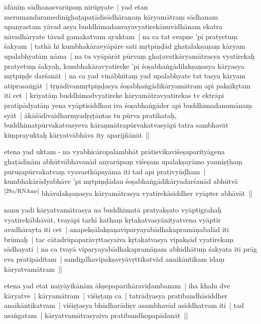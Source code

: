 \documentclass[article,a4paper]{memoir}
\newcommand{\gap}[1]{}
\newcommand{\deletion}[1]{($^{-}$#1)}
\begin{document}
	  \pstart idā\-nī\-ṃ sā\-dhanasvarū\-paṃ nirū\-pyate | yad etan merumandaramedinī\-ghaṭapaṭā\-disā\-dhā\-raṇaṃ kā\-ryamā\-traṃ sā\-dhanam upanyastam yā\-vad asya buddhimadanvayavyatirekā\-nuvidhā\-nam ekatra nā\-vadhā\-ryate tā\-vad gamakatvam ayuktam | na ca tat svapne 'pi pratyetuṃ śakyam | tathā\- hi kumbhakā\-ravyā\-pā\-re sati mṛtpiṇḍā\-d ghaṭalakṣaṇaṃ kā\-ryam upalabhyatā\-ṃ nā\-ma | na tu vyā\-pā\-rā\-t pū\-rvaṃ ghaṭavatkā\-ryamā\-trasya vyatirekaḥ pratyetuṃ śakyaḥ, kumbhakā\-ravyatireke 'pi śoṣabhaṅgā\-dilakṣaṇasya kā\-ryasya mṛtpiṇḍe darśanā\-t | na ca yad vinā\-bhū\-taṃ yad upalabhyate tat tasya kā\-ryam atiprasaṅgā\-t | tṛṇā\-divanmṛtpiṇḍasya śoṣabhaṅgā\-dikā\-ryamā\-tram api pakṣī\-kṛtam iti cet | kriyatā\-ṃ buddhimadvyatireke kā\-ryamā\-travyatirekas tv ektrā\-pi pratipā\-dyatā\-ṃ yena vyā\-ptisiddhau \edtext{tṛṇādir}{\Afootnote{tṛṇā\-di\deletion{|}\gap{}r \cite{}; tṛṇā\-dir \cite{}  {\rmlatinfont [App type: var]}}} iva śoṣabhaṅgā\-der api buddhimadanumā\-naṃ syā\-t | ā\-kā\-śā\-divaidharmyadṛṣṭā\-ntas tu pū\-rva pratihataḥ, buddhimatpū\-rvakatvasyeva kā\-raṇmā\-trapū\-rvakatvasyā\-pi tatra sambhavā\-t kiṃprayuktaḥ kā\-ryatvā\-bhā\-va ity aparijñā\-nā\-t ||
	\pend
      

	  \pstart etena yad uktam - na vyabhicā\-ropalambhā\-t prā\-tisvikaviśeṣaparityā\-gena ghaṭā\-dī\-nā\-m abhū\-tvā\-bhavanā\-d anyarū\-paṃ viśeṣam upalakṣayā\-mo yanniṣṭhaṃ puruṣapū\-rvakatvaṃ vyavasthā\-payā\-ma iti tad api prativyū\-ḍham | kumbhakā\-rā\-dyabhā\-ve 'pi mṛtpiṇḍā\-dau śoṣabhaṅgā\-dikā\-ryadarśanā\-d abhū\-tvā\- \leavevmode\textsuperscript{\rmlatinfont\tiny [29a/RNAms]}\label{RNAms-29a} bhā\-valakṣaṇasya kā\-ryamā\-trasya vyatirekā\-siddher vyā\-pter abhā\-vā\-t ||
	\pend
      

	  \pstart nanu yadi kā\-ryatvamā\-trasya na buddhimatā\- pratyakṣato vyā\-ptigrahaḥ vyatirekā\-bhā\-vā\-t, tvayā\-pi tarhi kathaṃ kṛtakatvasyā\-nityatvena vyā\-ptir avadhā\-rayta iti cet | anapekṣā\-lakṣaṇaviparyayabā\-dhakapramā\-ṇabalā\-d iti brū\-maḥ | tac cā\-tadrū\-paparā\-vṛttasyaiva kṛtakatvasya vipakṣā\-d vyatirekaṃ sā\-dhayati | na ca tvayā\- viparyayabā\-dhakapramā\-ṇam abhidhā\-tuṃ śakyata iti prā\-g eva pratipā\-ditam | sandigdhavipakṣavyā\-vṛttikatvā\-d anaikā\-ntikam idaṃ kā\-ryatvamā\-tram ||
	\pend
      

	  \pstart etena yad etat naiyā\-yikā\-nā\-m ā\-kṣepaparihā\-raviḍambanam | iha khalu dve kā\-ryatve | kā\-ryamā\-tram | viśiṣṭaṃ ca | tatrā\-dyasya pratibandhā\-siddher anaikā\-ntikatvam | viśiṣṭasya bhū\-dharā\-diṣv asambhavā\-d asiddhatvam iti | tad asaṅgatam | kā\-ryatvamā\-trasyaiva pratibandhopapā\-danā\-t ||
	\pend
      
\end{document}
